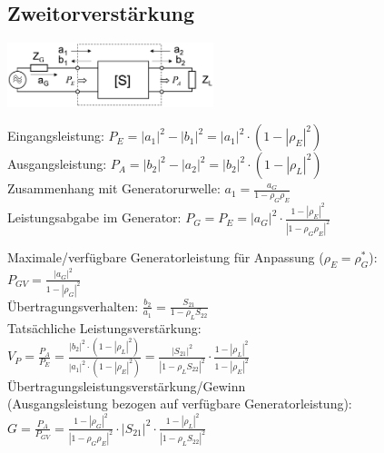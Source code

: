\documentclass[english]{latex4ei/latex4ei_sheet}
\begin{document}
\begin{sectionbox}
    \subsection{Zweitorverstärkung}
    \begin{center}\includegraphics[width = 6cm]{./img/zweitorverstaerkung.png}\end{center}
    Eingangsleistung: $P_{E}=\left|a_{1}\right|^{2}-\left|b_{1}\right|^{2} =\left|a_{1}\right|^{2} \cdot\left(1-\left|\rho_{E}\right|^{2}\right)$\\
    Ausgangsleistung: $P_{A}=\left|b_{2}\right|^{2}-\left|a_{2}\right|^{2}=\left|b_{2}\right|^{2} \cdot\left(1-\left|\rho_{L}\right|^{2}\right)$\\

    Zusammenhang mit Generatorurwelle: $a_{1}=\frac{a_{G}}{1-\rho_{G} \rho_{E}}$\\

    Leistungsabgabe im Generator: $P_G = P_E = \left|a_{G}\right|^{2} \cdot \frac{1-\left|\rho_{E}\right|^{2}}{\left|1-\rho_{G} \rho_{E}\right|^{2}}$

    Maximale/verfügbare Generatorleistung für Anpassung ($\rho_{E}=\rho_{G}^{*}$):\\
    $P_{G V}=\frac{\left|a_{G}\right|^{2}}{1-\left|\rho_{G}\right|^{2}}$\\

    Übertragungsverhalten: $\frac{b_{2}}{a_{1}}=\frac{S_{21}}{1-\rho_{L} S_{22}}$\\

    Tatsächliche Leistungsverstärkung:\\
    $V_{P}=\frac{P_{A}}{P_{E}}=\frac{\left|b_{2}\right|^{2} \cdot\left(1-\left|\rho_{L}\right|^{2}\right)}{\left|a_{1}\right|^{2} \cdot\left(1-\left|\rho_{E}\right|^{2}\right)}=\frac{\left|S_{21}\right|^{2}}{\left|1-\rho_{L} S_{22}\right|^{2}} \cdot \frac{1-\left|\rho_{L}\right|^{2}}{1-\left|\rho_{E}\right|^{2}}$\\

    Übertragungsleistungsverstärkung/Gewinn\\(Ausgangsleistung bezogen auf verfügbare Generatorleistung):\\
    $G=\frac{P_{A}}{P_{G V}} = \frac{1-\left|\rho_{G}\right|^{2}}{\left|1-\rho_{G} \rho_{E}\right|^{2}} \cdot\left|S_{21}\right|^{2} \cdot \frac{1-\left|\rho_{L}\right|^{2}}{\left|1-\rho_{L} S_{22}\right|^{2}}$\\


\end{sectionbox}
\end{document}

